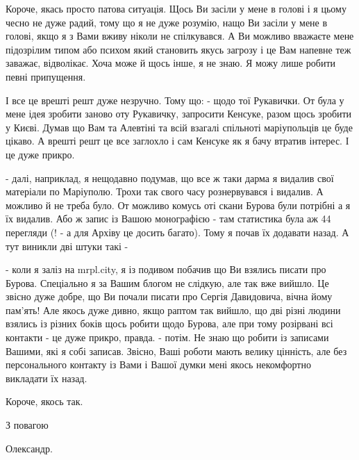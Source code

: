 Короче, якась просто патова ситуація. Щось Ви засіли у мене в голові і я цьому чесно не дуже радий,
тому що я не дуже розумію, нащо Ви засіли у мене в голові, якщо я з Вами вживу ніколи не спілкувався.
А Ви можливо вважаєте мене підозрілим типом або психом який становить якусь загрозу і це Вам напевне теж заважає, відволікає.
Хоча може й щось інше, я не знаю. Я можу лише робити певні припущення. 

І все це врешті решт дуже незручно. Тому що:
- щодо тої Рукавички. От була у мене ідея зробити заново оту Рукавичку, запросити Кенсуке, разом щось зробити у Києві.
Думав що Вам та Алевтіні та всій взагалі спільноті маріупольців це буде цікаво.
А врешті решт це все заглохло і сам Кенсуке як я бачу втратив інтерес. І це дуже прикро.

- далі, наприклад, я нещодавно подумав, що все ж таки дарма я видалив свої матеріали по Маріуполю. Трохи так свого часу 
рознервувався і видалив. А можливо й не треба було. От можливо комусь оті скани Бурова були потрібні а я їх видалив. Або ж запис із Вашою монографією - там статистика була аж 44 перегляди (! - а для Архіву це досить багато). Тому я почав їх додавати назад.
А тут виникли дві штуки такі -

- коли я заліз на mrpl.city, я із подивом 
побачив що Ви взялись писати про Бурова. Спеціально я за Вашим блогом не слідкую, але так вже вийшло. 
Це звісно дуже добре, що Ви почали писати про Сергія Давидовича, вічна йому пам'ять! Але якось дуже дивно, 
якщо раптом так вийшло, що дві різні людини взялись із різних боків щось робити щодо Бурова, але при тому розірвані всі контакти - це дуже прикро, правда. 
- потім. Не знаю що робити із записами Вашими, які я собі записав. 
Звісно, Ваші роботи мають велику цінність, але без персонального контакту із Вами
і Вашої думки мені якось некомфортно викладати їх назад.

Короче, якось так.

З повагою

Олександр.
